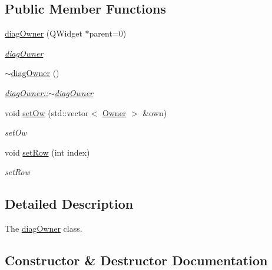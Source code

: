 \subsection*{Public Member Functions}
\begin{DoxyCompactItemize}
\item 
\hyperlink{classdiagOwner_a97c3f1ea7838f58881ca683c673d3fd9}{diag\+Owner} (Q\+Widget $\ast$parent=0)
\begin{DoxyCompactList}\small\item\em \hyperlink{classdiagOwner}{diag\+Owner} \end{DoxyCompactList}\item 
\hypertarget{classdiagOwner_ada2fa9627fd5ee15d304e36225c61e49}{}\hyperlink{classdiagOwner_ada2fa9627fd5ee15d304e36225c61e49}{$\sim$diag\+Owner} ()\label{classdiagOwner_ada2fa9627fd5ee15d304e36225c61e49}

\begin{DoxyCompactList}\small\item\em \hyperlink{classdiagOwner_ada2fa9627fd5ee15d304e36225c61e49}{diag\+Owner\+::$\sim$diag\+Owner} \end{DoxyCompactList}\item 
void \hyperlink{classdiagOwner_a959bea0fcf0af99211559fa8eac779c6}{set\+Ow} (std\+::vector$<$ \hyperlink{classOwner}{Owner} $>$ \&own)
\begin{DoxyCompactList}\small\item\em set\+Ow \end{DoxyCompactList}\item 
void \hyperlink{classdiagOwner_aafa9885bca20002ea2a6ad44f1ebb1be}{set\+Row} (int index)
\begin{DoxyCompactList}\small\item\em set\+Row \end{DoxyCompactList}\end{DoxyCompactItemize}


\subsection{Detailed Description}
The \hyperlink{classdiagOwner}{diag\+Owner} class. 

\subsection{Constructor \& Destructor Documentation}
\hypertarget{classdiagOwner_a97c3f1ea7838f58881ca683c673d3fd9}{}
